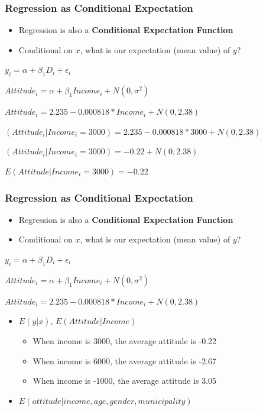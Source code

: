 \documentclass[xcolor=x11names,compress]{beamer}\usepackage[]{graphicx}\usepackage[]{color}
\renewcommand{\(}{\begin{columns}}
\renewcommand{\)}{\end{columns}}
\newcommand{\<}[1]{\begin{column}{#1}}
\renewcommand{\>}{\end{column}}
\begin{document}
\begin{frame}
\frametitle{Regression as Conditional Expectation}
\begin{itemize}
\item Regression is also a \textbf{Conditional Expectation Function}
\pause
\item Conditional on $x$, what is our expectation (mean value) of $y$?
\end{itemize}
\small
\begin{center}
\item $y_i = \alpha + \beta_1 D_i + \epsilon_i$ \\
\pause
\item $Attitude_i = \alpha + \beta_1 Income_i + N(0,\sigma^2)$ \\
\pause
\item $Attitude_i = 2.235 - 0.000818 * Income_i + N(0,2.38)$ \\
\pause
\item $(Attitude_i | Income_i=3000) = 2.235 - 0.000818 * 3000 + N(0,2.38)$ \\
\pause
\item $(Attitude_i | Income_i=3000) = -0.22 + N(0,2.38)$ \\
\pause
\item $E(Attitude | Income_i=3000) = -0.22$
\end{center}
\normalsize
\end{frame}

\begin{frame}
\frametitle{Regression as Conditional Expectation}
\begin{itemize}
\item Regression is also a \textbf{Conditional Expectation Function}
\item Conditional on $x$, what is our expectation (mean value) of $y$?
\end{itemize}
\small
\begin{center}
\item $y_i = \alpha + \beta_1 D_i + \epsilon_i$
\item $Attitude_i = \alpha + \beta_1 Income_i + N(0,\sigma^2)$
\item $Attitude_i = 2.235 - 0.000818 * Income_i + N(0,2.38)$
\end{center}
\normalsize
\pause
\begin{itemize}
\item $E(y|x)$, $E(Attitude | Income)$
\begin{itemize}
\item When income is 3000, the average attitude is -0.22
\pause
\item When income  is 6000, the average attitude is -2.67
\pause
\item When income  is -1000, the average attitude is 3.05
\end{itemize}
\pause
\item $E(attitude|income,age,gender,municipality)$
\end{itemize}
\end{frame}
\end{document}
